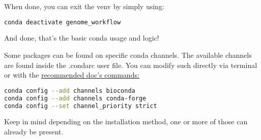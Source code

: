 \documentclass[a4paper,11pt]{article}
\begin{document}
When done, you can exit the venv by simply using:
\begin{lstlisting}[language=bash]
conda deactivate genome_workflow
\end{lstlisting}
And done, that's the basic conda usage and logic!
\begin{tipbox}
Some packages can be found on specific conda channels. The available channels
are found inside the .condarc user file. You can modify such directly via
terminal or with the \href{https://bioconda.github.io/}{recommended doc's
commands:}
\begin{lstlisting}[language=bash]
conda config --add channels bioconda
conda config --add channels conda-forge
conda config --set channel_priority strict
\end{lstlisting}
Keep in mind depending on the installation method, one or more of those can
already be present.
\end{tipbox}
\end{document}
